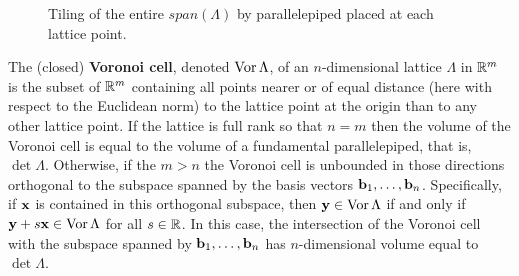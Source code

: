 \begin{figure}[t]
  \centering
  \caption{Tiling of the entire $span(\Lambda)$ by parallelepiped placed at each lattice point.}
  \label{fig:ch2-parallelepiped-tiling}
\end{figure}


The (closed) \textbf{Voronoi cell}, denoted $\operatorname{Vor}\Lambda$, of an $n$-dimensional lattice $\Lambda$ in ${\mathbb R}^m$ is the subset of ${\mathbb R}^m$ containing all points nearer or of equal distance (here with respect to the Euclidean norm) to the lattice point at the origin than to any other lattice point. If the lattice is full rank so that $n=m$ then the volume of the Voronoi cell is equal to the volume of a fundamental parallelepiped, that is, $\det\Lambda$.  Otherwise, if the $m > n$ the Voronoi cell is unbounded in those directions orthogonal to the subspace spanned by the basis vectors $\mathbf{b}_1,\dots,\mathbf{b}_n$.  Specifically, if $\mathbf{x}$ is contained in this orthogonal subspace, then $\mathbf{y} \in \operatorname{Vor}\Lambda$ if and only if $\mathbf{y} + s \mathbf{x} \in \operatorname{Vor}\Lambda$ for all $s \in {\mathbb R}$.   In this case, the intersection of the Voronoi cell with the subspace spanned by $\mathbf{b}_1,\dots,\mathbf{b}_n$ has $n$-dimensional volume equal to $\det\Lambda$.  

